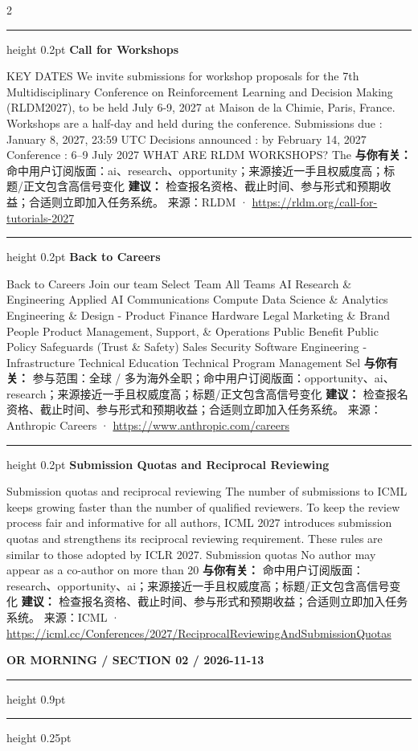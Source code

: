 \documentclass[10.5pt]{ctexart}
\begin{document}
\begin{multicols}{2}
\vspace{2mm}
\hrule height 0.2pt
\vspace{2mm}
{\large\bfseries Call for Workshops}\par
KEY DATES We invite submissions for workshop proposals for the 7th Multidisciplinary Conference on Reinforcement Learning and Decision Making (RLDM2027), to be held July 6-9, 2027 at Maison de la Chimie, Paris, France. Workshops are a half-day and held during the conference. Submissions due : January 8, 2027, 23:59 UTC Decisions announced : by February 14, 2027 Conference : 6–9 July 2027 WHAT ARE RLDM WORKSHOPS? The 
\textbf{与你有关：} 命中用户订阅版面：ai、research、opportunity；来源接近一手且权威度高；标题/正文包含高信号变化
\textbf{建议：} 检查报名资格、截止时间、参与形式和预期收益；合适则立即加入任务系统。
{\footnotesize\color{ormuted} 来源：RLDM · \url{https://rldm.org/call-for-tutorials-2027}}
\vspace{2mm}
\hrule height 0.2pt
\vspace{2mm}
{\large\bfseries Back to Careers}\par
Back to Careers Join our team Select Team All Teams AI Research \& Engineering Applied AI Communications Compute Data Science \& Analytics Engineering \& Design - Product Finance Hardware Legal Marketing \& Brand People Product Management, Support, \& Operations Public Benefit Public Policy Safeguards (Trust \& Safety) Sales Security Software Engineering - Infrastructure Technical Education Technical Program Management Sel
\textbf{与你有关：} 参与范围：全球 / 多为海外全职；命中用户订阅版面：opportunity、ai、research；来源接近一手且权威度高；标题/正文包含高信号变化
\textbf{建议：} 检查报名资格、截止时间、参与形式和预期收益；合适则立即加入任务系统。
{\footnotesize\color{ormuted} 来源：Anthropic Careers · \url{https://www.anthropic.com/careers}}
\vspace{2mm}
\hrule height 0.2pt
\vspace{2mm}
{\large\bfseries Submission Quotas and Reciprocal Reviewing}\par
Submission quotas and reciprocal reviewing The number of submissions to ICML keeps growing faster than the number of qualified reviewers. To keep the review process fair and informative for all authors, ICML 2027 introduces submission quotas and strengthens its reciprocal reviewing requirement. These rules are similar to those adopted by ICLR 2027. Submission quotas No author may appear as a co-author on more than 20
\textbf{与你有关：} 命中用户订阅版面：research、opportunity、ai；来源接近一手且权威度高；标题/正文包含高信号变化
\textbf{建议：} 检查报名资格、截止时间、参与形式和预期收益；合适则立即加入任务系统。
{\footnotesize\color{ormuted} 来源：ICML · \url{https://icml.cc/Conferences/2027/ReciprocalReviewingAndSubmissionQuotas}}
\end{multicols}
\newpage
{\small\bfseries OR MORNING / SECTION 02 / 2026-11-13}
\vspace{2mm}
\hrule height 0.9pt
\vspace{1.5mm}
\hrule height 0.25pt
\vspace{4mm}
\end{document}
